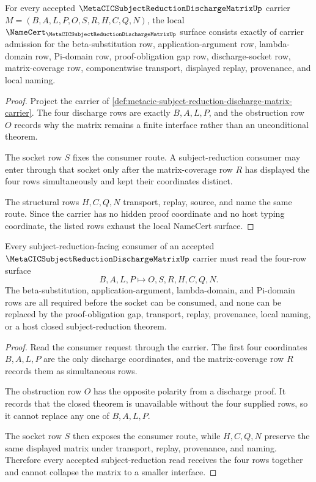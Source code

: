 \begin{theorem}
\label{thm:metacic-subject-reduction-discharge-matrix-namecert-obligations}
For every accepted $\MetaCICSubjectReductionDischargeMatrixUp$ carrier $M=(B,A,L,P,O,S,R,H,C,Q,N)$, the local $\NameCert_{\MetaCICSubjectReductionDischargeMatrixUp}$ surface consists exactly of carrier admission for the beta-substitution row, application-argument row, lambda-domain row, Pi-domain row, proof-obligation gap row, discharge-socket row, matrix-coverage row, componentwise transport, displayed replay, provenance, and local naming.
\end{theorem}
\begin{proof}
Project the carrier of \autoref{def:metacic-subject-reduction-discharge-matrix-carrier}. The four discharge rows are exactly $B,A,L,P$, and the obstruction row $O$ records why the matrix remains a finite interface rather than an unconditional theorem.

The socket row $S$ fixes the consumer route. A subject-reduction consumer may enter through that socket only after the matrix-coverage row $R$ has displayed the four rows simultaneously and kept their coordinates distinct.

The structural rows $H,C,Q,N$ transport, replay, source, and name the same route. Since the carrier has no hidden proof coordinate and no host typing coordinate, the listed rows exhaust the local NameCert surface.
\end{proof}

\begin{theorem}
\label{thm:metacic-subject-reduction-discharge-matrix-four-row-coverage}
Every subject-reduction-facing consumer of an accepted $\MetaCICSubjectReductionDischargeMatrixUp$ carrier must read the four-row surface
$$
B,A,L,P \longmapsto O,S,R,H,C,Q,N .
$$
The beta-substitution, application-argument, lambda-domain, and Pi-domain rows are all required before the socket can be consumed, and none can be replaced by the proof-obligation gap, transport, replay, provenance, local naming, or a host closed subject-reduction theorem.
\end{theorem}
\begin{proof}
Read the consumer request through the carrier. The first four coordinates $B,A,L,P$ are the only discharge coordinates, and the matrix-coverage row $R$ records them as simultaneous rows.

The obstruction row $O$ has the opposite polarity from a discharge proof. It records that the closed theorem is unavailable without the four supplied rows, so it cannot replace any one of $B,A,L,P$.

The socket row $S$ then exposes the consumer route, while $H,C,Q,N$ preserve the same displayed matrix under transport, replay, provenance, and naming. Therefore every accepted subject-reduction read receives the four rows together and cannot collapse the matrix to a smaller interface.
\end{proof}

